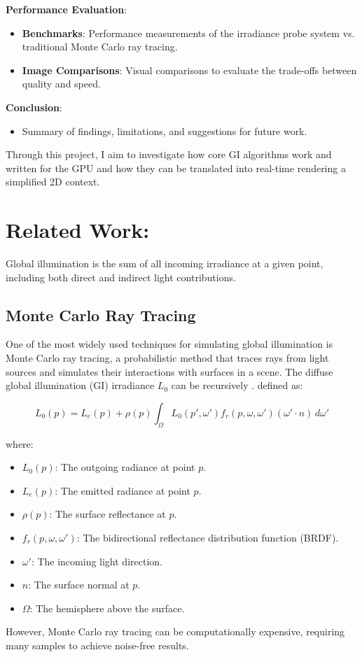 \documentclass[acmtog, nonacm]{acmart}
\begin{document}
\textbf{Performance Evaluation}:
\begin{itemize}
  \item \textbf{Benchmarks}: Performance measurements of the irradiance probe system vs. traditional Monte Carlo ray tracing.
  \item \textbf{Image Comparisons}: Visual comparisons to evaluate the trade-offs between quality and speed.
\end{itemize}

\textbf{Conclusion}:
\begin{itemize}
  \item Summary of findings, limitations, and suggestions for future work.
\end{itemize}

Through this project, I aim to investigate how core GI algorithms work and written for the GPU and how they can be translated into real-time rendering a simplified 2D context.

\section{Related Work:}
Global illumination is the sum of all incoming irradiance at a given point, including both direct and indirect light contributions. 

\subsection{Monte Carlo Ray Tracing}
One of the most widely used techniques for simulating global illumination is Monte Carlo ray tracing, a probabilistic method that traces rays from light sources and simulates their interactions with surfaces in a scene. 
The diffuse global illumination (GI) irradiance \( L_0 \) can be recursively \cite{kajiya}. defined as:

\begin{equation}
L_0(p) = L_e(p) + \rho(p) \int_{\Omega} L_0(p', \omega') f_r(p, \omega, \omega') (\omega' \cdot n) \, d\omega'
\end{equation}

where:
\begin{itemize}
  \item \( L_0(p) \): The outgoing radiance at point \( p \).
  \item \( L_e(p) \): The emitted radiance at point \( p \).
  \item \( \rho(p) \): The surface reflectance at \( p \).
  \item \( f_r(p, \omega, \omega') \): The bidirectional reflectance distribution function (BRDF).
  \item \( \omega' \): The incoming light direction.
  \item \( n \): The surface normal at \( p \).
  \item \( \Omega \): The hemisphere above the surface.
\end{itemize}
 However, Monte Carlo ray tracing can be computationally expensive, requiring many samples to achieve noise-free results. 
\end{document}
